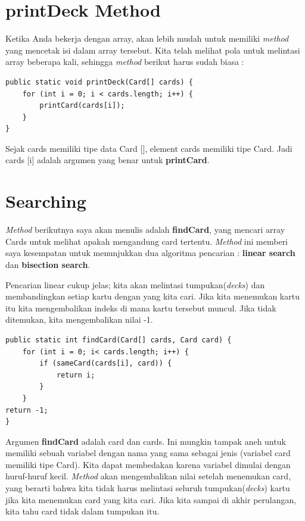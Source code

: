 \documentclass[12pt,b5paper,openright,twoside]{book}
\begin{document}
\section{printDeck Method}
Ketika Anda bekerja dengan array, akan lebih mudah untuk memiliki \textit{method} yang mencetak isi dalam array tersebut. Kita telah melihat pola untuk melintasi array beberapa kali, sehingga \textit{method} berikut harus sudah biasa :
\begin{lstlisting}
public static void printDeck(Card[] cards) { 
    for (int i = 0; i < cards.length; i++) { 
        printCard(cards[i]); 
    } 
}
\end{lstlisting}

\noindent Sejak cards memiliki tipe data Card [], element cards memiliki tipe Card. Jadi cards [i] adalah argumen yang benar untuk \textbf{printCard}.

\section{Searching}
\textit{Method} berikutnya saya akan menulis adalah \textbf{findCard}, yang mencari array Cards untuk melihat apakah mengandung card tertentu. \textit{Method} ini memberi saya kesempatan untuk menunjukkan dua algoritma pencarian : \textbf{linear search} dan \textbf{bisection search}.

\noindent Pencarian linear cukup jelas; kita akan melintasi tumpukan(\textit{decks}) dan membandingkan setiap kartu dengan yang kita cari. Jika kita menemukan kartu itu kita mengembalikan indeks di mana kartu tersebut muncul. Jika tidak ditemukan, kita mengembalikan nilai -1.
\begin{lstlisting}
public static int findCard(Card[] cards, Card card) { 
    for (int i = 0; i< cards.length; i++) {
        if (sameCard(cards[i], card)) { 
            return i; 
        }
    } 
return -1;
}
\end{lstlisting}

\noindent Argumen \textbf{findCard} adalah card dan cards. Ini mungkin tampak aneh untuk memiliki sebuah variabel dengan nama yang sama sebagai jenis (variabel card memiliki tipe Card). Kita dapat membedakan karena variabel dimulai dengan huruf-huruf kecil. \textit{Method} akan mengembalikan nilai setelah menemukan card, yang berarti bahwa kita tidak harus melintasi seluruh tumpukan(\textit{decks}) kartu jika kita menemukan card yang kita cari. Jika kita sampai di akhir perulangan, kita tahu card tidak dalam tumpukan itu.
\end{document}
